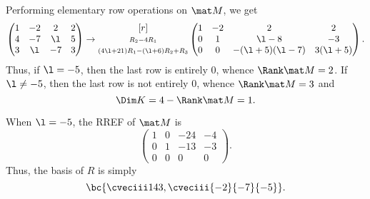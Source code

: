 \begin{solution}
    \begin{ppart}
        Performing elementary row operations on $\mat M$, we get \[\begin{pmatrix}1 & -2 & 2 & 2 \\ 4 & -7 & \l & 5 \\ 3 & \l & -7 & 3\end{pmatrix} \rightarrow \begin{matrix}[r] \\ \scriptstyle R_2 - 4R_1 \\ \scriptstyle (4\l+21)R_1 - (\l+6)R_2 + R_3\end{matrix}\begin{pmatrix}1 & -2 & 2 & 2 \\ 0 & 1 & \l-8 & - 3 \\ 0 & 0 & -(\l+5)(\l-7) & 3(\l + 5)\end{pmatrix}.\] Thus, if $\l = -5$, then the last row is entirely 0, whence $\Rank \mat M = 2$. If $\l \neq -5$, then the last row is not entirely 0, whence $\Rank \mat M = 3$ and \[\Dim K = 4 - \Rank \mat M = 1.\]
    \end{ppart}
    \begin{ppart}
        When $\l = -5$, the RREF of $\mat M$ is \[\begin{pmatrix}1 & 0 & -24 & -4 \\ 0 & 1 & -13 & -3 \\ 0 & 0 & 0 & 0\end{pmatrix}.\] Thus, the basis of $R$ is simply \[\bc{\cveciii143, \cveciii{-2}{-7}{-5}}.\]


\end{ppart}
\end{solution}
